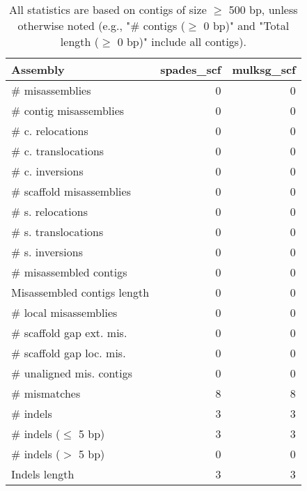 \documentclass[12pt,a4paper]{article}
\begin{document}
\begin{table}[ht]
\begin{center}
\caption{All statistics are based on contigs of size $\geq$ 500 bp, unless otherwise noted (e.g., "\# contigs ($\geq$ 0 bp)" and "Total length ($\geq$ 0 bp)" include all contigs).}
\begin{tabular}{|l*{2}{|r}|}
\hline
Assembly & spades\_scf & mulksg\_scf \\ \hline
\# misassemblies & 0 & 0 \\ \hline
\hspace{2mm}\# contig misassemblies & 0 & 0 \\ \hline
\hspace{5mm}\# c. relocations & 0 & 0 \\ \hline
\hspace{5mm}\# c. translocations & 0 & 0 \\ \hline
\hspace{5mm}\# c. inversions & 0 & 0 \\ \hline
\hspace{2mm}\# scaffold misassemblies & 0 & 0 \\ \hline
\hspace{5mm}\# s. relocations & 0 & 0 \\ \hline
\hspace{5mm}\# s. translocations & 0 & 0 \\ \hline
\hspace{5mm}\# s. inversions & 0 & 0 \\ \hline
\# misassembled contigs & 0 & 0 \\ \hline
Misassembled contigs length & 0 & 0 \\ \hline
\# local misassemblies & 0 & 0 \\ \hline
\# scaffold gap ext. mis. & 0 & 0 \\ \hline
\# scaffold gap loc. mis. & 0 & 0 \\ \hline
\# unaligned mis. contigs & 0 & 0 \\ \hline
\# mismatches & 8 & 8 \\ \hline
\# indels & 3 & 3 \\ \hline
\hspace{5mm}\# indels ($\leq$ 5 bp) & 3 & 3 \\ \hline
\hspace{5mm}\# indels ($>$ 5 bp) & 0 & 0 \\ \hline
Indels length & 3 & 3 \\ \hline
\end{tabular}
\end{center}
\end{table}
\end{document}
